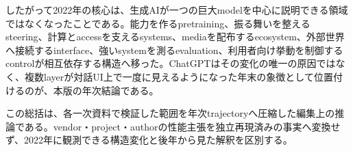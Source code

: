 したがって2022年の核心は、生成AIが一つの巨大modelを中心に説明できる領域ではなくなったことである。能力を作るpretraining、振る舞いを整えるsteering、計算とaccessを支えるsystems、mediaを配布するecosystem、外部世界へ接続するinterface、強いsystemを測るevaluation、利用者向け挙動を制御するcontrolが相互依存する構造へ移った。ChatGPTはその変化の唯一の原因ではなく、複数layerが対話UI上で一度に見えるようになった年末の象徴として位置付けるのが、本版の年次結論である。\autocite{src-16a1a1dc486e,src-1e362767e63c,src-26aadbc0393f,src-27297a80fac0,src-2832ee43ab8f,src-2c38d2f354fa,src-6ffa5c4e64ca,src-811e1008822e,src-86ce6205a4ed,src-87477ad8b476,src-929080260e16,src-bc1a61aec959,src-e58f1e9c8754,src-e8da8e8f02bc}


\begin{claimboundary}
この総括は、各一次資料で検証した範囲を年次trajectoryへ圧縮した編集上の推論である。vendor・project・authorの性能主張を独立再現済みの事実へ変換せず、2022年に観測できる構造変化と後年から見た解釈を区別する。\autocite{src-1e362767e63c,src-87477ad8b476,src-e58f1e9c8754}
\end{claimboundary}
